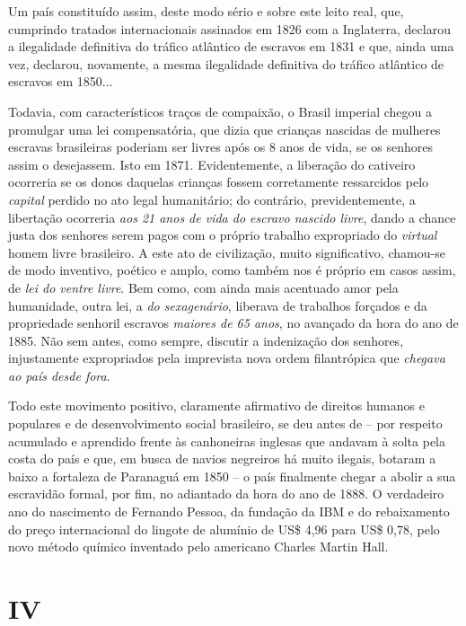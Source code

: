 Um país constituído assim, deste modo sério e sobre este leito real,
que, cumprindo tratados internacionais assinados em 1826 com a
Inglaterra, declarou a ilegalidade definitiva do tráfico atlântico de
escravos em 1831 e que, ainda uma vez, declarou, novamente, a mesma
ilegalidade definitiva do tráfico atlântico de escravos em 1850...

Todavia, com característicos traços de compaixão, o Brasil imperial
chegou a promulgar uma lei compensatória, que dizia que crianças
nascidas de mulheres escravas brasileiras poderiam ser livres após os 8
anos de vida, se os senhores assim o desejassem. Isto em 1871.
Evidentemente, a liberação do cativeiro ocorreria se os donos daquelas
crianças fossem corretamente ressarcidos pelo \emph{capital} perdido no
ato legal humanitário; do contrário, previdentemente, a libertação
ocorreria \emph{aos 21 anos de vida do escravo nascido livre}, dando a
chance justa dos senhores serem pagos com o próprio trabalho expropriado
do \emph{virtual} homem livre brasileiro. A este ato de civilização,
muito significativo, chamou-se de modo inventivo, poético e amplo, como
também nos é próprio em casos assim, de \emph{lei do ventre livre}. Bem
como, com ainda mais acentuado amor pela humanidade, outra lei, a
\emph{do sexagenário}, liberava de trabalhos forçados e da propriedade
senhoril escravos \emph{maiores de 65 anos}, no avançado da hora do ano
de 1885. Não sem antes, como sempre, discutir a indenização dos
senhores, injustamente expropriados pela imprevista nova ordem
filantrópica que \emph{chegava ao país desde fora}.

Todo este movimento positivo, claramente afirmativo de direitos humanos
e populares e de desenvolvimento social brasileiro, se deu antes de --
por respeito acumulado e aprendido frente às canhoneiras inglesas que
andavam à solta pela costa do país e que, em busca de navios negreiros
há muito ilegais, botaram a baixo a fortaleza de Paranaguá em 1850 -- o
país finalmente chegar a abolir a sua escravidão formal, por fim, no
adiantado da hora do ano de 1888. O verdadeiro ano do nascimento de
Fernando Pessoa, da fundação da IBM e do rebaixamento do preço
internacional do lingote de alumínio de US\$ 4,96 para US\$ 0,78, pelo
novo método químico inventado pelo americano Charles Martin Hall.

\section{IV}

